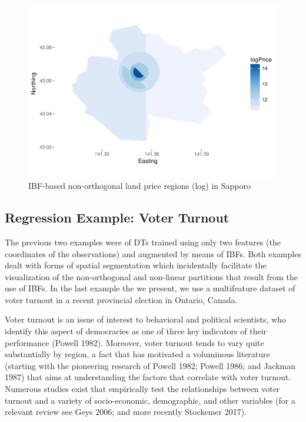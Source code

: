 \documentclass[]{elsarticle} %
\makeatletter
\def\maxwidth{\ifdim\Gin@nat@width>\linewidth\linewidth
\else\Gin@nat@width\fi}
\let\Oldincludegraphics\includegraphics
\renewcommand{\includegraphics}[1]{\Oldincludegraphics[width=\maxwidth]{#1}}
\makeatother
\begin{document}
\begin{figure}[htbp]
\centering
\includegraphics{Trees_with_Base_Functions_files/figure-latex/fig20-map-basis-sapporo-1.pdf}
\caption{\label{fig:fig20-map-basis-sapporo}IBF-based non-orthogonal
land price regions (log) in Sapporo}
\end{figure}

\subsection{Regression Example: Voter
Turnout}\label{regression-example-voter-turnout}

The previous two examples were of DTs trained using only two features
(the coordinates of the observations) and augmented by means of IBFs.
Both examples dealt with forms of spatial segmentation which
incidentally facilitate the visualization of the non-orthogonal and
non-linear partitions that result from the use of IBFs. In the last
example the we present, we use a multifeature dataset of voter turnout
in a recent provincial election in Ontario, Canada.

Voter turnout is an issue of interest to behavioral and political
scientists, who identify this aspect of democracies as one of three key
indicators of their performance (Powell 1982). Moreover, voter turnout
tends to vary quite substantially by region, a fact that has motivated a
voluminous literature (starting with the pioneering research of Powell
1982; Powell 1986; and Jackman 1987) that aims at understanding the
factors that correlate with voter turnout. Numerous studies exist that
empirically test the relationships between voter turnout and a variety
of socio-economic, demographic, and other variables (for a relevant
review see Geys 2006; and more recently Stockemer 2017).
\end{document}
